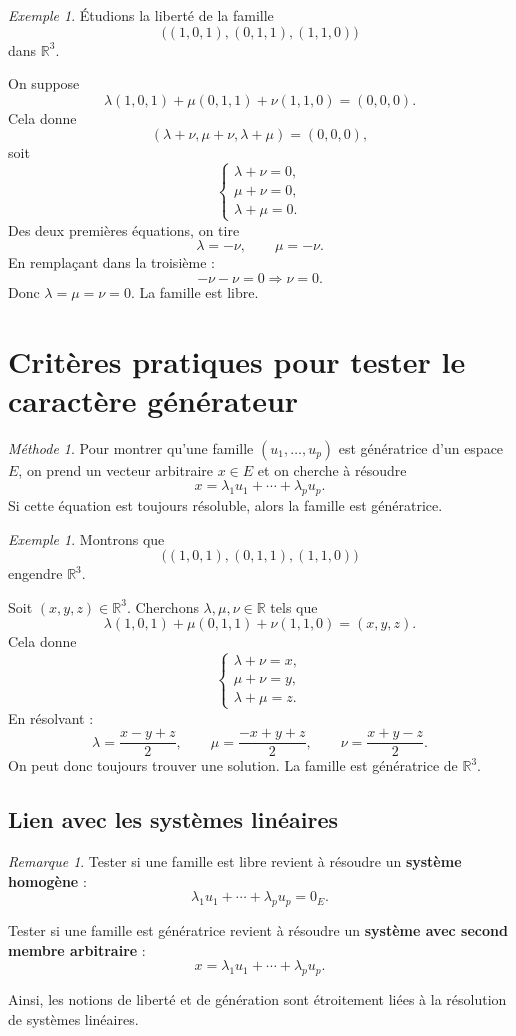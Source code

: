 \documentclass[11pt,a4paper]{article}
\theoremstyle{remark}
\newtheorem{remarque}[definition]{Remarque}
\newtheorem{exemple}[definition]{Exemple}
\newtheorem*{methode}{Méthode}
\newcommand{\R}{\mathbb{R}}
\begin{document}
\begin{exemple}
Étudions la liberté de la famille
\[
\big((1,0,1),(0,1,1),(1,1,0)\big)
\]
dans \(\R^3\).

On suppose
\[
\lambda(1,0,1)+\mu(0,1,1)+\nu(1,1,0)=(0,0,0).
\]
Cela donne
\[
(\lambda+\nu,\mu+\nu,\lambda+\mu)=(0,0,0),
\]
soit
\[
\begin{cases}
\lambda+\nu=0,\\
\mu+\nu=0,\\
\lambda+\mu=0.
\end{cases}
\]
Des deux premières équations, on tire
\[
\lambda=-\nu,\qquad \mu=-\nu.
\]
En remplaçant dans la troisième :
\[
-\nu-\nu=0 \Longrightarrow \nu=0.
\]
Donc \(\lambda=\mu=\nu=0\). La famille est libre.
\end{exemple}

\section{Critères pratiques pour tester le caractère générateur}

\begin{methode}
Pour montrer qu’une famille \((u_1,\dots,u_p)\) est génératrice d’un espace \(E\), on prend un vecteur arbitraire \(x\in E\) et on cherche à résoudre
\[
x=\lambda_1u_1+\cdots+\lambda_pu_p.
\]
Si cette équation est toujours résoluble, alors la famille est génératrice.
\end{methode}

\begin{exemple}
Montrons que
\[
\big((1,0,1),(0,1,1),(1,1,0)\big)
\]
engendre \(\R^3\).

Soit \((x,y,z)\in\R^3\). Cherchons \(\lambda,\mu,\nu\in\R\) tels que
\[
\lambda(1,0,1)+\mu(0,1,1)+\nu(1,1,0)=(x,y,z).
\]
Cela donne
\[
\begin{cases}
\lambda+\nu=x,\\
\mu+\nu=y,\\
\lambda+\mu=z.
\end{cases}
\]
En résolvant :
\[
\lambda=\frac{x-y+z}{2},\qquad
\mu=\frac{-x+y+z}{2},\qquad
\nu=\frac{x+y-z}{2}.
\]
On peut donc toujours trouver une solution. La famille est génératrice de \(\R^3\).
\end{exemple}

\subsection{Lien avec les systèmes linéaires}

\begin{remarque}
Tester si une famille est libre revient à résoudre un \textbf{système homogène} :
\[
\lambda_1u_1+\cdots+\lambda_pu_p=0_E.
\]

Tester si une famille est génératrice revient à résoudre un \textbf{système avec second membre arbitraire} :
\[
x=\lambda_1u_1+\cdots+\lambda_pu_p.
\]

Ainsi, les notions de liberté et de génération sont étroitement liées à la résolution de systèmes linéaires.
\end{remarque}
\end{document}

